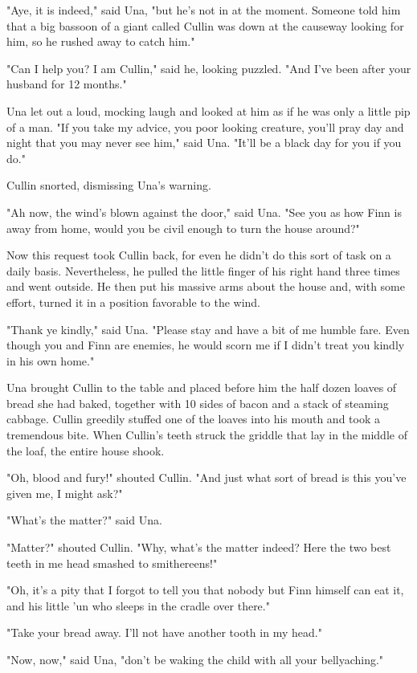 "Aye, it is indeed," said Una, "but he's not in at the moment. Someone told him that a big bassoon of a giant called Cullin was down at the causeway looking for him, so he rushed away to catch him."

"Can I help you? I am Cullin," said he, looking puzzled. "And I've been after your husband for 12 months."

Una let out a loud, mocking laugh and looked at him as if he was only a little pip of a man. "If you take my advice, you poor looking creature, you'll pray day and night that you may never see him," said Una. "It'll be a black day for you if you do."

Cullin snorted, dismissing Una's warning.

"Ah now, the wind's blown against the door," said Una. "See you as how Finn is away from home, would you be civil enough to turn the house around?"

Now this request took Cullin back, for even he didn't do this sort of task on a daily basis. Nevertheless, he pulled the little finger of his right hand three times and went outside. He then put his massive arms about the house and, with some effort, turned it in a position favorable to the wind.

"Thank ye kindly," said Una. "Please stay and have a bit of me humble fare. Even though you and Finn are enemies, he would scorn me if I didn't treat you kindly in his own home."

Una brought Cullin to the table and placed before him the half dozen loaves of bread she had baked, together with 10 sides of bacon and a stack of steaming cabbage. Cullin greedily stuffed one of the loaves into his mouth and took a tremendous bite. When Cullin's teeth struck the griddle that lay in the middle of the loaf, the entire house shook.

"Oh, blood and fury!" shouted Cullin. "And just what sort of bread is this you've given me, I might ask?"

"What's the matter?" said Una.

"Matter?" shouted Cullin. "Why, what's the matter indeed? Here the two best teeth in me head smashed to smithereens!"

"Oh, it's a pity that I forgot to tell you that nobody but Finn himself can eat it, and his little 'un who sleeps in the cradle over there."

"Take your bread away. I'll not have another tooth in my head."

"Now, now," said Una, "don't be waking the child with all your bellyaching."

